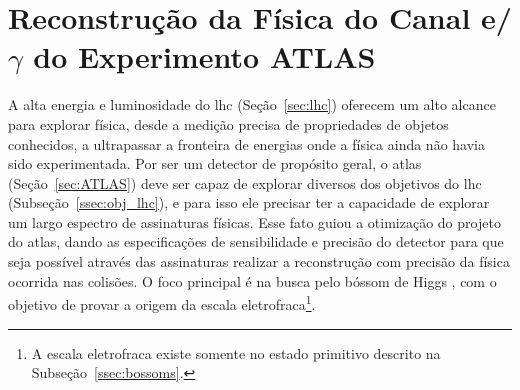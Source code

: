 \chapter[Reconstrução da Física do Canal eGamma do Experimento ATLAS]
{Reconstrução da Física do Canal e/$\gamma$ do Experimento ATLAS}
\label{cap:reco}


A alta energia e luminosidade do \gls{lhc} (Seção~\ref{sec:lhc}) oferecem um alto alcance para
explorar física, desde a medição precisa de propriedades de objetos conhecidos, a
ultrapassar a fronteira de energias onde a física ainda não havia sido experimentada.
Por ser um detector de propósito geral, o \gls{atlas} (Seção~\ref{sec:ATLAS}) deve ser capaz de
explorar diversos dos objetivos do \gls{lhc} (Subseção~\ref{ssec:obj_lhc}), e
para isso ele precisar ter a capacidade de explorar um largo espectro de assinaturas
físicas. Esse fato guiou a otimização do projeto do \gls{atlas}, dando as especificações de sensibilidade e precisão do
detector para que seja possível através das assinaturas realizar a reconstrução
com precisão da física ocorrida nas colisões. O foco principal é na busca pelo
bóssom de Higgs \cite{ATLAS_TDR2}, com o objetivo de provar a origem da escala
eletrofraca\footnote{A escala eletrofraca existe somente no estado primitivo descrito na
Subseção~\ref{ssec:bossoms}.}. 


